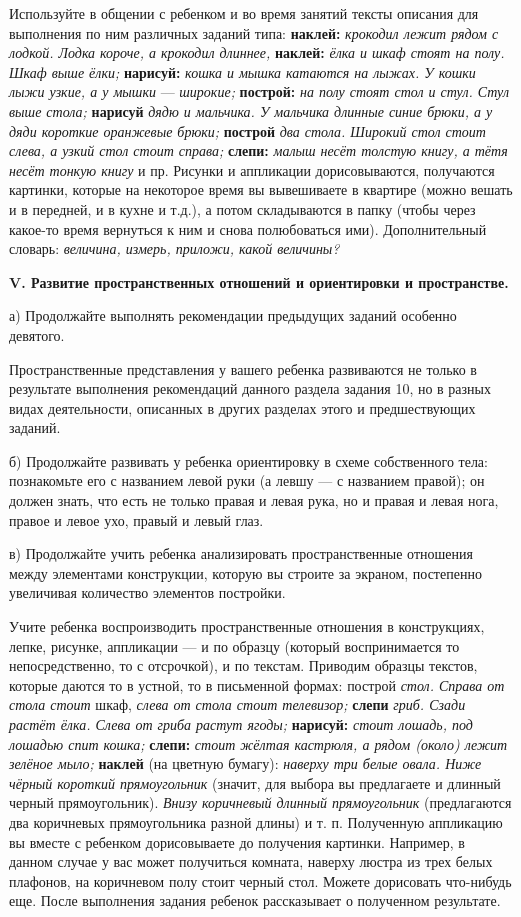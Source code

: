 \documentclass[a5paper]{book}
\renewcommand{\emph}[1]{\textit{#1}}
\begin{document}
Используйте в общении с ребенком и во время занятий тексты описания для
выполнения по ним различных заданий типа: \textbf{наклей:}
\emph{крокодил лежит рядом с лодкой. Лодка короче, а крокодил длиннее,}
\textbf{наклей:} \emph{ёлка и шкаф стоят на полу. Шкаф выше ёлки;}
\textbf{нарисуй:} \emph{кошка и мышка катаются на лыжах. У кошки лыжи
узкие, а у мышки} --- \emph{широкие;} \textbf{построй:} \emph{на полу
стоят стол и стул. Стул выше стола;} \textbf{нарисуй} \emph{дядю и
мальчика. У мальчика длинные синие брюки, а у дяди короткие оранжевые
брюки;} \textbf{построй} \emph{два стола. Широкий стол стоит слева, а
узкий стол стоит справа;} \textbf{слепи:} \emph{малыш несёт толстую
книгу, а тётя несёт тонкую книгу} и пр. Рисунки и аппликации
дорисовываются, получаются картинки, которые на некоторое время вы
вывешиваете в квартире (можно вешать и в передней, и в кухне и т.д.), а
потом складываются в папку (чтобы через какое-то время вернуться к ним и
снова полюбоваться ими). Дополнительный словарь: \emph{величина, измерь,
приложи, какой величины?}

\textbf{V. Развитие пространственных отношений и ориентировки и
пространстве.}

а) Продолжайте выполнять рекомендации предыдущих заданий особенно
девятого.

Пространственные представления у вашего ребенка развиваются не только в
результате выполнения рекомендаций данного раздела задания 10, но в
разных видах деятельности, описанных в других разделах этого и
предшествующих заданий.

б) Продолжайте развивать у ребенка ориентировку в схеме собственного
тела: познакомьте его с названием левой руки (а левшу --- с названием
правой); он должен знать, что есть не только правая и левая рука, но и
правая и левая нога, правое и левое ухо, правый и левый глаз.

в) Продолжайте учить ребенка анализировать пространственные отношения
между элементами конструкции, которую вы строите за экраном, постепенно
увеличивая количество элементов постройки.

Учите ребенка воспроизводить пространственные отношения в конструкциях,
лепке, рисунке, аппликации --- и по образцу (который воспринимается то
непосредственно, то с отсрочкой), и по текстам. Приводим образцы
текстов, которые даются то в устной, то в письменной формах: построй
\emph{стол. Справа от стола стоит} шкаф, \emph{слева от стола стоит
телевизор;} \textbf{слепи} \emph{гриб. Сзади растёт ёлка. Слева от гриба
растут ягоды;} \textbf{нарисуй:} \emph{стоит лошадь, под лошадью спит
кошка;} \textbf{слепи:} \emph{стоит жёлтая кастрюля, а рядом (около)
лежит зелёное мыло;} \textbf{наклей} (на цветную бумагу): \emph{наверху
три белые овала. Ниже чёрный короткий прямоугольник} (значит, для выбора
вы предлагаете и длинный черный прямоугольник). \emph{Внизу коричневый
длинный прямоугольник} (предлагаются два коричневых прямоугольника
разной длины) и т. п. Полученную аппликацию вы вместе с ребенком
дорисовываете до получения картинки. Например, в данном случае у вас
может получиться комната, наверху люстра из трех белых плафонов, на
коричневом полу стоит черный стол. Можете дорисовать что-нибудь еще.
После выполнения задания ребенок рассказывает о полученном результате.
\end{document}
